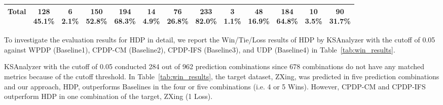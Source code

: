 \begin{table}[!t]
\begin{tabular}{|c||c|c|c||c|c|c||c|c|c||c|c|c|}
    Total       &\specialcell{{128}\\{45.1\%}}  &\specialcell{{6}\\{2.1\%}}     &\specialcell{{150}\\{52.8\%}}  &\specialcell{{194}\\{68.3\%}}  &\specialcell{{14}\\{4.9\%}}    &\specialcell{{76}\\{26.8\%}}   &\specialcell{{233}\\{82.0\%}}  &\specialcell{{3}\\{1.1\%}}     &\specialcell{{48}\\{16.9\%}}   &\specialcell{{184}\\{64.8\%}}  &\specialcell{{10}\\{3.5\%}}    &\specialcell{{90}\\{31.7\%}}\\ \hline
\end{tabular}
\end{table}


To investigate the evaluation results for HDP in detail, we report
the Win/Tie/Loss results of HDP by KSAnalyzer with the cutoff of 0.05 against
WPDP (Baseline1), CPDP-CM (Baseline2), CPDP-IFS (Baseline3), and UDP (Baseline4) in Table~\ref{tab:win_results}.


KSAnalyzer with the cutoff of 0.05 conducted 284 out of 962 prediction
combinations since 678 combinations do not have any matched
metrics because of the cutoff threshold. In
Table~\ref{tab:win_results}, the target dataset, ZXing, was predicted in five
prediction combinations and our approach, HDP, outperforms Baselines in the four or five combinations (i.e. 4 or 5 Wins). However, CPDP-CM and CPDP-IFS outperform HDP in one combination of the target, ZXing (1 Loss).



